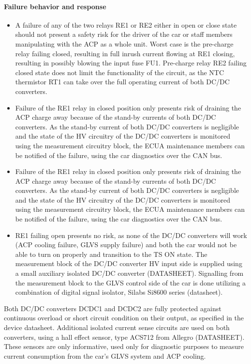 \paragraph{Failure behavior and response}
\begin{itemize}
	\item A failure of any of the two relays RE1 or RE2 either in open or close state should not present a safety risk for the driver of the car or staff members manipulating with the ACP as a whole unit. 
	Worst case is the pre-charge relay failing closed, resulting in full inrush current flowing at RE1 closing, resulting in possibly blowing the input fuse FU1. Pre-charge relay RE2 failing closed state does not limit the functionality of the circuit, as the NTC thermistor RT1 can take over the full operating current of both DC/DC converters.
	\item Failure of the RE1 relay in closed position only presents risk of draining the ACP charge away because of the stand-by currents of both DC/DC converters. As the stand-by current of both DC/DC converters is negligible and the state of the HV circuitry of the DC/DC converters is monitored using the measurement circuitry block, the ECUA maintenance members can be notified of the failure, using the car diagnostics over the CAN bus.
	\item Failure of the RE1 relay in closed position only presents risk of draining the ACP charge away because of the stand-by currents of both DC/DC converters. As the stand-by current of both DC/DC converters is negligible and the state of the HV circuitry of the DC/DC converters is monitored using the measurement circuitry block, the ECUA maintenance members can be notified of the failure, using the car diagnostics over the CAN bus. 
	\item RE1 failing open presents no risk, as none of the DC/DC converters will work (ACP cooling failure, GLVS supply failure) and both the car would not be able to turn on properly and transition to the TS ON state.
	The measurement block of the DC/DC converter HV input side is supplied using a small auxiliary isolated DC/DC converter (DATASHEET). Signalling from the measurement block to the GLVS control side of the car is done utilizing a combination of digital signal isolator, Silabs Si8600 series (datasheet).
\end{itemize}


Both DC/DC converters DCDC1 and DCDC2 are fully protected against continuous overload or short circuit condition on their output, as specified in the device datasheet. Additional isolated current sense circuits are used on both converters, using a hall effect sensor, type ACS712 from Allegro (DATASHEET). These sensors are only informative, used only for diagnostic purposes to measure current consumption from the car's GLVS system and ACP cooling.

